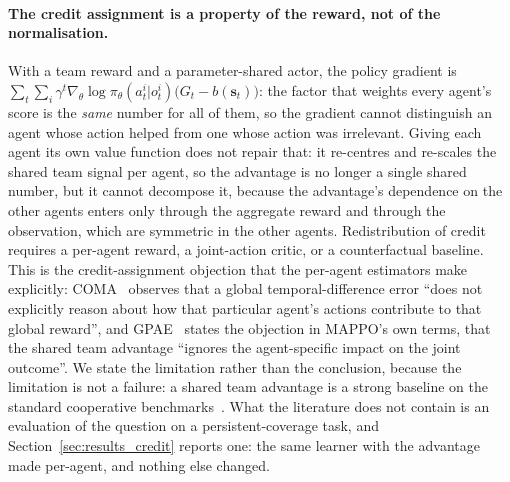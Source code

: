 \documentclass[conference]{IEEEtran}
\begin{document}
\paragraph{The credit assignment is a property of the reward, not of the
normalisation.} With a team reward and a parameter-shared actor, the
policy gradient is $\sum_t\sum_i\gamma^t\nabla_\theta\log\pi_\theta(a_t^i|o_t^i)
\bigl(G_t-b(\mathbf s_t)\bigr)$: the factor that weights every agent's
score is the \emph{same} number for all of them, so the gradient cannot
distinguish an agent whose action helped from one whose action was
irrelevant. Giving each agent its own value function does not repair
that: it re-centres and re-scales the shared team signal per agent,
so the advantage is no longer a single shared number, but it cannot
decompose it, because the advantage's dependence on the other agents
enters only through the aggregate reward and through the observation,
which are symmetric in the other agents. Redistribution of credit
requires a per-agent reward, a joint-action critic, or a
counterfactual baseline. This is the credit-assignment objection that the per-agent
estimators make explicitly: COMA~\cite{foerster2018} observes that a
global temporal-difference error ``does not explicitly reason about how
that particular agent's actions contribute to that global reward'', and
GPAE~\cite{kim2026} states the objection in MAPPO's own terms, that the
shared team advantage ``ignores the agent-specific impact on the joint
outcome''. We state the limitation rather than the conclusion, because the
limitation is not a failure: a shared team advantage is a strong baseline on
the standard cooperative benchmarks~\cite{yu2022,dewitt2021}. What the
literature does not contain is an evaluation of the question on a
persistent-coverage task, and Section~\ref{sec:results_credit} reports one:
the same learner with the advantage made per-agent, and nothing else
changed.
\end{document}
